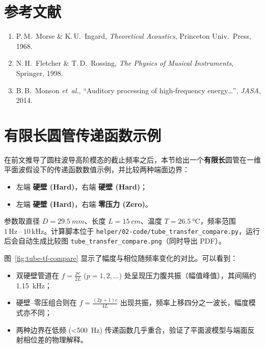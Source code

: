 \documentclass[12pt,a4paper]{article}
\begin{document}
\section{参考文献}

\begin{enumerate}
    \item P.\,M.~Morse \& K.\,U.~Ingard, \emph{Theoretical Acoustics}, Princeton Univ.\ Press, 1968.
    \item N.\,H.~Fletcher \& T.\,D.~Rossing, \emph{The Physics of Musical Instruments}, Springer, 1998.
    \item B.\,B.~Monson \emph{et~al.}, ``Auditory processing of high-frequency energy…'', \emph{JASA}, 2014.
\end{enumerate}

\section{有限长圆管传递函数示例}
\label{sec:tube_tf}

在前文推导了圆柱波导高阶模态的截止频率之后，本节给出一个\textbf{有限长}圆管在一维平面波假设下的传递函数数值示例，并比较两种端面边界：

\begin{itemize}
  \item 左端 \textbf{硬壁 (Hard)}，右端 \textbf{硬壁 (Hard)}；
  \item 左端 \textbf{硬壁 (Hard)}，右端 \textbf{零压力 (Zero)}。
\end{itemize}

参数取直径 $D=\SI{29.5}{mm}$、长度 $L=\SI{15}{cm}$、温度 $T=\SI{26.5}{\celsius}$，频率范围 $1\,\mathrm{Hz}\,\text{--}\,10\,\mathrm{kHz}$。计算脚本位于 
\texttt{helper/02-code/tube\_transfer\_compare.py}，运行后会自动生成比较图 \texttt{tube\_transfer\_compare.png}（同时导出 PDF）。

图~\ref{fig:tube-tf-compare} 显示了幅度与相位随频率变化的对比。可以看到：

\begin{itemize}
  \item 双硬壁管道在 $f=\tfrac{pc}{2L}$ ($p=1,2,\dots$) 处呈现压力腹共振（幅值峰值），其间隔约 \SI{1.15}{kHz}；
  \item 硬壁--零压组合则在 $f=\tfrac{(2p+1)c}{4L}$ 出现共振，频率上移四分之一波长，幅度模式亦不同；
  \item 两种边界在低频 (\SI{<500}{Hz}) 传递函数几乎重合，验证了平面波模型与端面反射相位差的物理解释。
\end{itemize}
\end{document}
